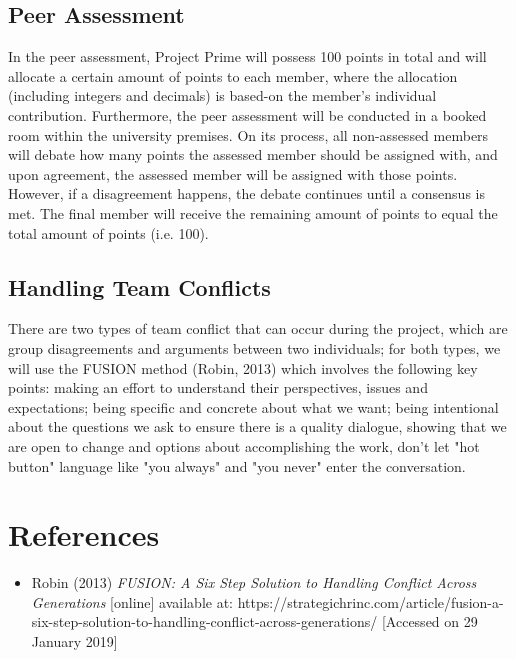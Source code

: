 \documentclass{article}
\begin{document}
	\subsection{Peer Assessment}
	In the peer assessment, Project Prime will possess 100 points in total and will allocate a certain amount of points to each member, where the allocation (including integers and decimals) is based-on the member's individual contribution. Furthermore, the peer assessment will be conducted in a booked room within the university premises. On its process, all non-assessed members will debate how many points the assessed member should be assigned  with, and upon agreement, the assessed member will be assigned with those points. However, if a disagreement happens, the debate continues until a consensus is met. The final member will receive the remaining amount of points to equal the total amount of points (i.e. 100).

	\subsection{Handling Team Conflicts}
	There are two types of team conflict that can occur during the project, which are group disagreements and arguments between two individuals; for both types, we will use the FUSION method (Robin, 2013) which involves the following key points: making an effort to understand their perspectives, issues and expectations; being specific and concrete about what we want; being intentional about the questions we ask to ensure there is a quality dialogue, showing that we are open to change and options about accomplishing the work, don't let "hot button" language like "you always" and "you never" enter the conversation.

\section{References}
\begin{itemize}
\item Robin (2013) \textit{FUSION: A Six Step Solution to Handling Conflict Across Generations} [online] available at: https://strategichrinc.com/article/fusion-a-six-step-solution-to-handling-conflict-across-generations/ [Accessed on 29 January 2019]
\end{itemize}
\end{document}
